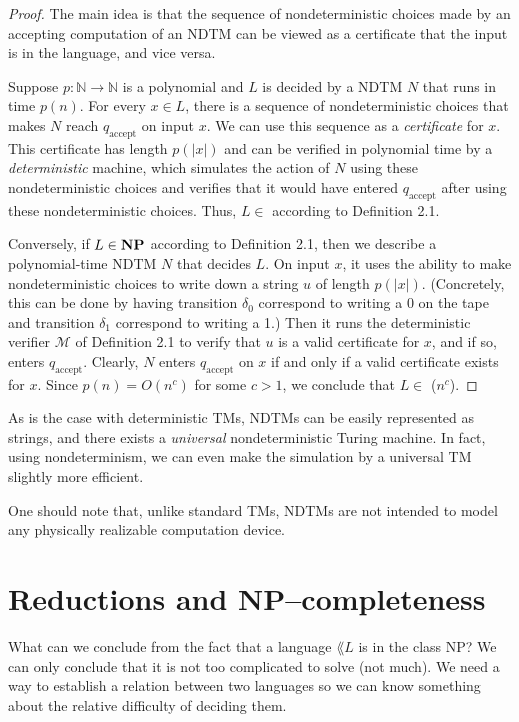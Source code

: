 \begin{proof}
	The main idea is that the sequence of nondeterministic choices made by an accepting computation of an NDTM can be viewed as a certificate that the input is in the language, and vice versa.

	Suppose $p : \mathbb{N} \to \mathbb{N}$ is a polynomial and $L$ is decided by a NDTM $N$ that runs in time $p(n)$. For every $x \in L$, there is a sequence of nondeterministic choices that makes $N$ reach $q_{\text{accept}}$ on input $x$. We can use this sequence as a \emph{certificate} for $x$. This certificate has length $p(|x|)$ and can be verified in polynomial time by a \emph{deterministic} machine, which simulates the action of $N$ using these nondeterministic choices and verifies that it would have entered $q_{\text{accept}}$ after using these nondeterministic choices. Thus, $L \in$ \NP{} according to Definition 2.1.

	Conversely, if $L \in \textbf{NP}$ according to Definition 2.1, then we describe a polynomial-time NDTM $N$ that decides $L$. On input $x$, it uses the ability to make nondeterministic choices to write down a string $u$ of length $p(|x|)$. (Concretely, this can be done by having transition $\delta_0$ correspond to writing a 0 on the tape and transition $\delta_1$ correspond to writing a 1.) Then it runs the deterministic verifier $\mathcal{M}$ of Definition 2.1 to verify that $u$ is a valid certificate for $x$, and if so, enters $q_{\text{accept}}$. Clearly, $N$ enters $q_{\text{accept}}$ on $x$ if and only if a valid certificate exists for $x$. Since $p(n) = O(n^c)$ for some $c > 1$, we conclude that $L \in$ \NTIME($n^c$).
\end{proof}

As is the case with deterministic TMs, NDTMs can be easily represented as strings, and there exists a \emph{universal} nondeterministic Turing machine. In fact, using nondeterminism, we can even make the simulation by a universal TM slightly more efficient.

One should note that, unlike standard TMs, NDTMs are not intended to model any physically realizable computation device.

\section{Reductions and NP--completeness}
What can we conclude from the fact that a language \(\lang{L}\) is in the class NP? We can only conclude that it is not too complicated to solve (not much). We need a way to establish a relation between two languages so we can know something about the relative difficulty of deciding them.\\

